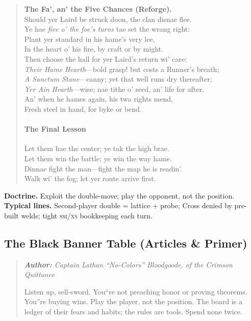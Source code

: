 \documentclass[11pt]{article}
\begin{document}
\begin{quote}
\textbf{The Fa', an' the Five Chances (Reforge).}\\
Should yer Laird be struck doon, the clan disnae flee.\\
Ye hae \emph{five o' the foe's turns} tae set the wrang right:\\
Plant yer standard in his hame's very lee,\\
In the heart o' his fire, by craft or by might.\\
Then choose the hall for yer Laird's return wi' care:\\
\quad\textit{Their Hame Hearth}---bold grasp! but costs a Runner's breath;\\
\quad\textit{A Sanctum Stane}---canny; yet that well runs dry thereafter;\\
\quad\textit{Yer Ain Hearth}---wise; nae tithe o' seed, an' life for after.\\
An' when he hames again, his twa rights mend,\\
Fresh steel in hand, for byke or bend.

\paragraph{The Final Lesson}
Let them hae the center; ye tak the high brae.\\
Let them win the battle; ye win the way hame.\\
Dinnae fight the man---fight the map he is readin'.\\
Walk wi' the fog; let yer route arrive first.
\end{quote}

\noindent\textbf{Doctrine.} Exploit the double-move; play the opponent, not the position. \quad
\textbf{Typical lines.} Second-player double = lattice + probe; Cross denied by pre-built welds; tight \textsc{ssi}/\textsc{xs} bookkeeping each turn.

\clearpage

\subsection{The Black Banner Table (Articles \& Primer)}

\begin{quote}\small\itshape
\textbf{Author:} Captain Lathan ``No-Colors'' Bloodgoode, of the \emph{Crimson Quittance}

Listen up, sell-sword. You``re not preaching honor or proving theorems. You''re buying wins. Play the player, not the position. The board is a ledger of their fears and habits; the rules are tools. Spend none twice.
\end{quote}
\end{document}

